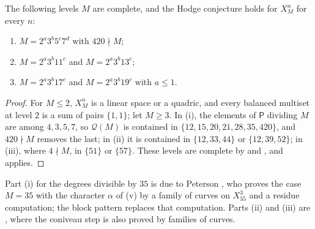 \begin{corollary}\label{cor:degrees}
The following levels $M$ are complete, and the Hodge conjecture holds for
$X^{n}_{M}$ for every $n$:
\begin{enumerate}[label=\textup{(\roman*)}]
\item $M=2^{a}3^{b}5^{c}7^{d}$ with $420\nmid M$;
\item $M=2^{a}3^{b}11^{c}$ and $M=2^{a}3^{b}13^{c}$;
\item $M=2^{a}3^{b}17^{c}$ and $M=2^{a}3^{b}19^{c}$ with $a\le1$.
\end{enumerate}
\end{corollary}

\begin{proof}
For $M\le2$, $X^{n}_{M}$ is a linear space or a quadric, and every
balanced multiset at level $2$ is a sum of pairs $\{1,1\}$; let $M\ge3$. In
(i), the elements of $\mathsf P$ dividing $M$ are among $4,3,5,7$, so
$\mathcal Q(M)$ is contained in $\{12,15,20,21,28,35,420\}$, and $420\nmid M$
removes the last; in (ii) it is contained in $\{12,33,44\}$ or $\{12,39,52\}$;
in (iii), where $4\nmid M$, in $\{51\}$ or $\{57\}$. These levels are
complete by  and , and
 applies.
\end{proof}

Part (i) for the degrees divisible by $35$ is due to Peterson \cite{Pet26},
who proves the case $M=35$ with the character $\alpha$ of
(v) by a family of curves on $X^{3}_{35}$ and a residue
computation; the block pattern replaces that computation. Parts (ii) and
(iii) are \cite[Theorem~A]{BBe84hc}, where the coniveau step is also proved
by families of curves.
